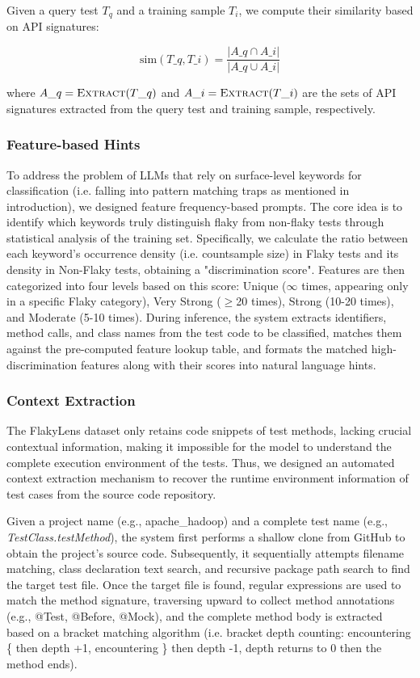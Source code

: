 \documentclass{article}
\begin{document}
Given a query test $T_q$ and a training sample $T_i$, we compute their similarity 
based on API signatures:

\begin{equation}
\text{sim}(T\_q, T\_i) = \frac{|A\_q \cap A\_i|}{|A\_q \cup A\_i|}
\end{equation}

where $A\_q = \textsc{Extract}(T\_q)$ and $A\_i = \textsc{Extract}(T\_i)$ are the sets of API signatures extracted from the query test and training sample, respectively.

\subsubsection{Feature-based Hints}

To address the problem of LLMs that rely on surface-level keywords for classification (i.e. falling into pattern matching traps as mentioned in introduction), we designed feature frequency-based prompts. The core idea is to identify which keywords truly distinguish flaky from non-flaky tests through statistical analysis of the training set. Specifically, we calculate the ratio between each keyword's occurrence density (i.e. count\/sample size) in Flaky tests and its density in Non-Flaky tests, obtaining a "discrimination score". Features are then categorized into four levels based on this score: Unique ($\infty$ times, appearing only in a specific Flaky category), Very Strong ($\geq$20 times), Strong (10-20 times), and Moderate (5-10 times). During inference, the system extracts identifiers, method calls, and class names from the test code to be classified, matches them against the pre-computed feature lookup table, and formats the matched high-discrimination features along with their scores into natural language hints.

\subsubsection{Context Extraction}
The FlakyLens dataset only retains code snippets of test methods, lacking crucial contextual information, making it impossible for the model to understand the complete execution environment of the tests. Thus, we designed an automated context extraction mechanism to recover the runtime environment information of test cases from the source code repository.

Given a project name (e.g., apache\_hadoop) and a complete test name (e.g., \textit{TestClass.testMethod}), the system first performs a shallow clone from GitHub to obtain the project's source code. Subsequently, it sequentially attempts filename matching, class declaration text search, and recursive package path search to find the target test file. Once the target file is found, regular expressions are used to match the method signature, traversing upward to collect method annotations (e.g., @Test, @Before, @Mock), and the complete method body is extracted based on a bracket matching algorithm (i.e. bracket depth counting: encountering \{ then depth +1, encountering \} then depth -1, depth returns to 0 then  the method ends).
\end{document}
